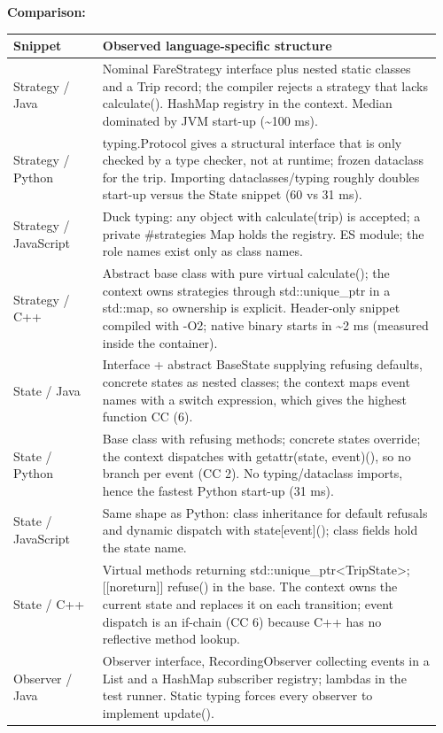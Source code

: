 \documentclass[11pt,a4paper]{article}
\begin{document}
\textbf{Comparison:}
\begin{longtable}{@{}P{0.2\linewidth}P{0.76\linewidth}@{}}\toprule Snippet & Observed language-specific structure\\\midrule\endhead
Strategy / Java & Nominal FareStrategy interface plus nested static classes and a Trip record; the compiler rejects a strategy that lacks calculate(). HashMap registry in the context. Median dominated by JVM start-up (\textasciitilde{}100 ms). \\
Strategy / Python & typing.Protocol gives a structural interface that is only checked by a type checker, not at runtime; frozen dataclass for the trip. Importing dataclasses/typing roughly doubles start-up versus the State snippet (60 vs 31 ms). \\
Strategy / JavaScript & Duck typing: any object with calculate(trip) is accepted; a private \#strategies Map holds the registry. ES module; the role names exist only as class names. \\
Strategy / C++ & Abstract base class with pure virtual calculate(); the context owns strategies through std::unique\_ptr in a std::map, so ownership is explicit. Header-only snippet compiled with -O2; native binary starts in \textasciitilde{}2 ms (measured inside the container). \\
State / Java & Interface + abstract BaseState supplying refusing defaults, concrete states as nested classes; the context maps event names with a switch expression, which gives the highest function CC (6). \\
State / Python & Base class with refusing methods; concrete states override; the context dispatches with getattr(state, event)(), so no branch per event (CC 2). No typing/dataclass imports, hence the fastest Python start-up (31 ms). \\
State / JavaScript & Same shape as Python: class inheritance for default refusals and dynamic dispatch with state[event](); class fields hold the state name. \\
State / C++ & Virtual methods returning std::unique\_ptr\textless{}TripState\textgreater{}; [[noreturn]] refuse() in the base. The context owns the current state and replaces it on each transition; event dispatch is an if-chain (CC 6) because C++ has no reflective method lookup. \\
Observer / Java & Observer interface, RecordingObserver collecting events in a List and a HashMap subscriber registry; lambdas in the test runner. Static typing forces every observer to implement update(). \\

\end{longtable}
\end{document}
